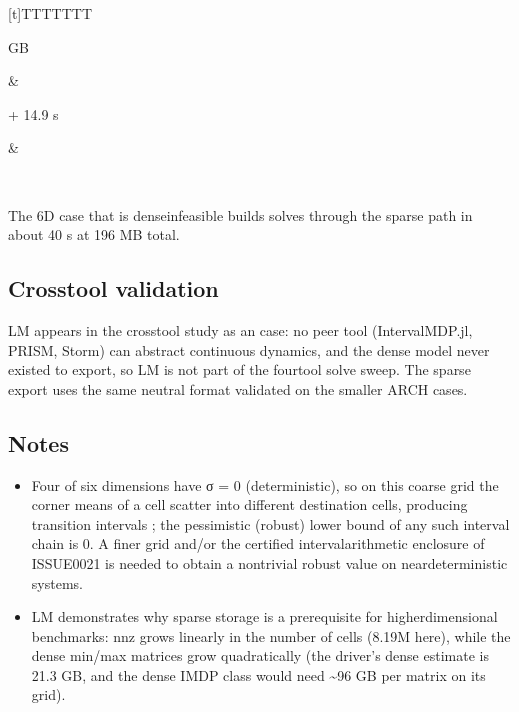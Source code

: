 \documentclass[a4paper,10pt,english]{sphinxmanual}
\begin{document}
\begin{savenotes}
\begin{tabulary}{\linewidth}[t]{TTTTTTT}
\begin{varwidth}[t]{}
 GB
\sphinxbeforeendvarwidth
\end{varwidth}%
&\begin{varwidth}[t]{}
 + 14.9 s
\sphinxbeforeendvarwidth
\end{varwidth}%
&\begin{varwidth}[t]{}
\sphinxbeforeendvarwidth
\end{varwidth}%
\\
\sphinxbottomrule
\end{tabulary}
\sphinxtableafterendhook\par
\sphinxattableend\end{savenotes}

\sphinxAtStartPar
The 6\sphinxhyphen{}D case that is dense\sphinxhyphen{}infeasible builds  solves through the sparse path
in about 40 s at 196 MB total.


\subsection{Cross\sphinxhyphen{}tool validation}
\label{\detokenize{benchmarks/LM:cross-tool-validation}}
\sphinxAtStartPar
LM appears in the cross\sphinxhyphen{}tool study as an  case: no peer tool
(IntervalMDP.jl, PRISM, Storm) can abstract continuous dynamics, and the dense model
never existed to export, so LM is not part of the four\sphinxhyphen{}tool solve sweep. The sparse
 export uses the same neutral format validated on the smaller ARCH cases.


\subsection{Notes}
\label{\detokenize{benchmarks/LM:notes}}\begin{itemize}
\item {} 
\sphinxAtStartPar
{} Four of six dimensions have
σ = 0 (deterministic), so on this coarse grid the corner means of a cell scatter
into different destination cells, producing transition intervals \sphinxcode{\sphinxupquote{{[}0,1{]}}}; the
pessimistic (robust) lower bound of any such interval chain is 0. A finer grid
and/or the certified interval\sphinxhyphen{}arithmetic enclosure of ISSUE\sphinxhyphen{}0021 is needed to
obtain a non\sphinxhyphen{}trivial robust value on near\sphinxhyphen{}deterministic systems.

\item {} 
\sphinxAtStartPar
LM demonstrates why sparse storage is a prerequisite for higher\sphinxhyphen{}dimensional
benchmarks: nnz grows linearly in the number of cells (8.19M here), while the
dense min/max matrices grow quadratically (the driver’s dense estimate is
21.3 GB, and the dense IMDP class would need \textasciitilde{}96 GB per matrix on its grid).

\end{itemize}
\end{document}
